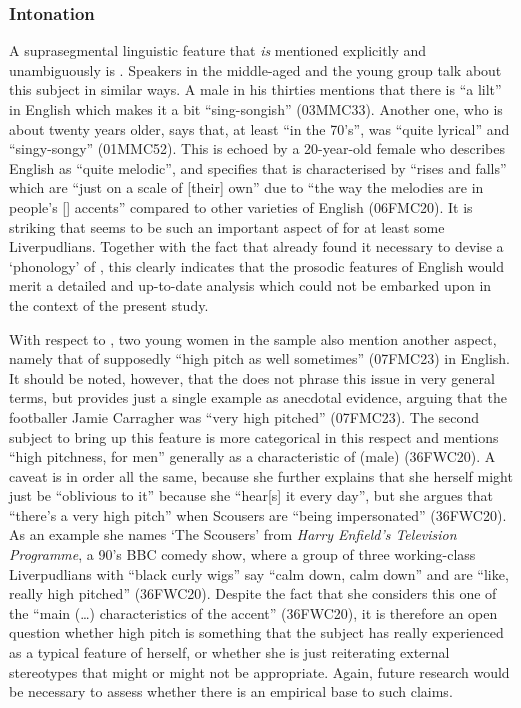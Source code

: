 \subsubsection{Intonation}

A suprasegmental linguistic feature that \emph{is} mentioned explicitly and unambiguously is .
Speakers in the middle-aged and the young group talk about this subject in similar ways.
A male in his thirties mentions that there is ``a lilt'' in  English which makes it a bit ``sing-songish'' (03MMC33).
Another one, who is about twenty years older, says that, at least ``in the 70's'',  was ``quite lyrical'' and ``singy-songy'' (01MMC52).
This is echoed by a 20-year-old female who describes  English as ``quite melodic'', and specifies that   is characterised by ``rises and falls'' which are ``just on a scale of [their] own'' due to ``the way the melodies are in people's [] accents'' compared to other varieties of English (06FMC20).
It is striking that  seems to be such an important aspect of  for at least some Liverpudlians.
Together with the fact that \textcite{knowles1973} already found it necessary to devise a `phonology' of  , this clearly indicates that the prosodic features of  English would merit a detailed and up-to-date analysis which could not be embarked upon in the context of the present study.

With respect to , two young women in the sample also mention another aspect, namely that of supposedly ``high pitch as well sometimes'' (07FMC23) in  English.
It should be noted, however, that the  does not phrase this issue in very general terms, but provides just a single example as anecdotal evidence, arguing that the footballer Jamie Carragher was ``very high pitched'' (07FMC23).
The second subject to bring up this feature is more categorical in this respect and mentions ``high pitchness, for men'' generally as a characteristic of (male)  (36FWC20).
A caveat is in order all the same, because she further explains that she herself might just be ``oblivious to it'' because she ``hear[s] it every day'', but she argues that ``there's a very high pitch'' when Scousers are ``being impersonated'' (36FWC20).
As an example she names `The Scousers' from \emph{Harry Enfield's Television Programme}, a 90's BBC comedy show, where a group of three  working-class Liverpudlians with ``black curly wigs'' say ``calm down, calm down'' and are ``like, really high pitched'' (36FWC20).
Despite the fact that she considers this one of the ``main (\ldots) characteristics of the accent'' (36FWC20), it is therefore an open question whether high pitch is something that the subject has really experienced as a typical feature of  herself, or whether she is just reiterating external stereotypes that might or might not be appropriate.
Again, future research would be necessary to assess whether there is an empirical base to such claims.

